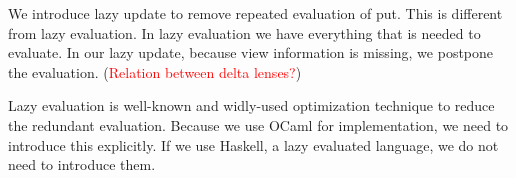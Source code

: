We introduce lazy update to remove repeated evaluation of put. This is different from lazy evaluation. In lazy evaluation we have everything that is needed to evaluate. In our lazy update, because view information is missing, we postpone the evaluation. (\textcolor{red}{Relation between delta lenses?})

Lazy evaluation \cite{} is well-known and widly-used optimization technique to reduce the redundant evaluation. Because we use OCaml for implementation, we need to introduce this explicitly. If we use Haskell, a lazy evaluated language, we do not need to introduce them.

